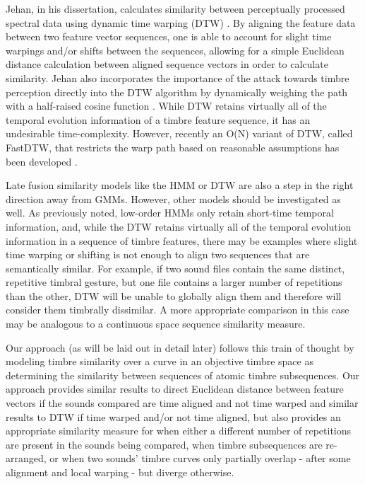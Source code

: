 \documentclass[a4paper,12pt]{report} 	%
\numberwithin{figure}{chapter}
\numberwithin{table}{chapter}
\numberwithin{equation}{chapter}
\begin{document}
\begin{flushleft}
Jehan, in his dissertation, calculates similarity between perceptually processed spectral data using dynamic time warping (DTW) \cite[p. 70]{Jehan:2005fy}. By aligning the feature data between two feature vector sequences, one is able to account for slight time warpings and/or shifts between the sequences, allowing for a simple Euclidean distance calculation between aligned sequence vectors in order to calculate similarity. Jehan also incorporates the importance of the attack towards timbre perception directly into the DTW algorithm by dynamically weighing the path with a half-raised cosine function \cite[p. 71]{Jehan:2005fy}. While DTW retains virtually all of the temporal evolution information of a timbre feature sequence, it has an undesirable time-complexity. However, recently an O(N) variant of DTW, called FastDTW, that restricts the warp path based on reasonable assumptions has been developed \cite{Salvador:2004et}.

Late fusion similarity models like the HMM or DTW are also a step in the right direction away from GMMs. However, other models should be investigated as well. As previously noted, low-order HMMs only retain short-time temporal information, and, while the DTW retains virtually all of the temporal evolution information in a sequence of timbre features, there may be examples where slight time warping or shifting is not enough to align two sequences that are semantically similar. For example, if two sound files contain the same distinct, repetitive timbral gesture, but one file contains a larger number of repetitions than the other, DTW will be unable to globally align them and therefore will consider them timbrally dissimilar. A more appropriate comparison in this case may be analogous to a continuous space sequence similarity measure.

Our approach (as will be laid out in detail later) follows this train of thought by modeling timbre similarity over a curve in an objective timbre space as determining the similarity between sequences of atomic timbre subsequences. Our approach provides similar results to direct Euclidean distance between feature vectors if the sounds compared are time aligned and not time warped and similar results to DTW if time warped and/or not time aligned, but also provides an appropriate similarity measure for when either a different number of repetitions are present in the sounds being compared, when timbre subsequences are re-arranged, or when two sounds' timbre curves only partially overlap - after some alignment and local warping - but diverge otherwise.


\end{flushleft}
\end{document}
